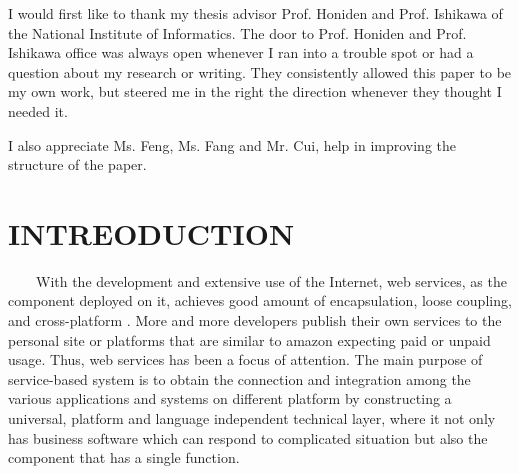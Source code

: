 \documentclass[senior,final,11pt]{iscs-thesis}
\begin{document}
\begin{acknowledge}
I would first like to thank my thesis advisor Prof. Honiden and Prof. Ishikawa of the National Institute of Informatics. The door to Prof. Honiden and Prof. Ishikawa office was always open whenever I ran into a trouble spot or had a question about my research or writing. They consistently allowed this paper to be my own work, but steered me in the right the direction whenever they thought I needed it.

I also appreciate Ms. Feng, Ms. Fang and Mr. Cui, help in improving the structure of the paper.
\end{acknowledge}

\frontmatter 
\tableofcontents
\mainmatter 

\chapter{INTREODUCTION}
~~~~With the development and extensive use of the Internet, web services, as the component deployed on it, achieves good amount of encapsulation, loose coupling, and cross-platform \cite{1}. More and more developers publish their own services to the personal site or platforms that are similar to amazon expecting paid or unpaid usage. Thus, web services has been a focus of attention\cite{2}.
The main purpose of service-based system is to obtain the connection and integration among the various applications and systems on different platform by constructing a universal, platform and language independent technical layer, where it not only has business software which can respond to complicated situation but also the component that has a single function.
\end{document}
